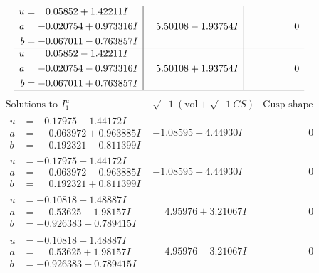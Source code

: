 \documentclass[1p]{elsarticle_modified}
\theoremstyle{definition}
\newcommand{\I}{\sqrt{-1}}
\begin{document}
$$\begin{array}{c|c|c}
\begin{aligned}
u &= \phantom{-}0.05852 + 1.42211 I \\
a &= -0.020754 + 0.973316 I \\
b &= -0.067011 - 0.763857 I\end{aligned}
 & \phantom{-}5.50108 - 1.93754 I & \phantom{-0.000000 } 0 \\ \hline\begin{aligned}
u &= \phantom{-}0.05852 - 1.42211 I \\
a &= -0.020754 - 0.973316 I \\
b &= -0.067011 + 0.763857 I\end{aligned}
 & \phantom{-}5.50108 + 1.93754 I & \phantom{-0.000000 } 0\\
 \hline 
 \end{array}$$\newpage$$\begin{array}{c|c|c}  
\text{Solutions to }I^u_{1}& \I (\text{vol} + \sqrt{-1}CS) & \text{Cusp shape}\\
 \hline 
\begin{aligned}
u &= -0.17975 + 1.44172 I \\
a &= \phantom{-}0.063972 + 0.963885 I \\
b &= \phantom{-}0.192321 - 0.811399 I\end{aligned}
 & -1.08595 + 4.44930 I & \phantom{-0.000000 } 0 \\ \hline\begin{aligned}
u &= -0.17975 - 1.44172 I \\
a &= \phantom{-}0.063972 - 0.963885 I \\
b &= \phantom{-}0.192321 + 0.811399 I\end{aligned}
 & -1.08595 - 4.44930 I & \phantom{-0.000000 } 0 \\ \hline\begin{aligned}
u &= -0.10818 + 1.48887 I \\
a &= \phantom{-}0.53625 - 1.98157 I \\
b &= -0.926383 + 0.789415 I\end{aligned}
 & \phantom{-}4.95976 + 3.21067 I & \phantom{-0.000000 } 0 \\ \hline\begin{aligned}
u &= -0.10818 - 1.48887 I \\
a &= \phantom{-}0.53625 + 1.98157 I \\
b &= -0.926383 - 0.789415 I\end{aligned}
 & \phantom{-}4.95976 - 3.21067 I & \phantom{-0.000000 } 0 \\ \hline\begin{aligned}

\end{aligned}
\end{array}$$
\end{document}
